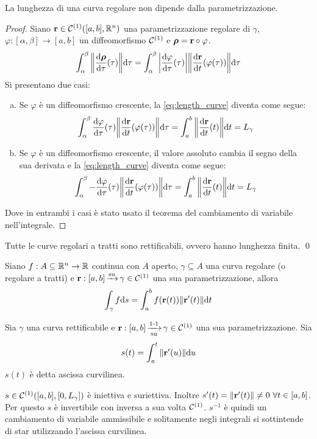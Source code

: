 \begin{prop}\label{prop:length_invariance}
	La lunghezza di una curva regolare non dipende dalla parametrizzazione.
\end{prop}

\begin{proof}
	Siano $\vb{r}\in\mathcal{C}^{(1)}([a,b],\mathbb{R}^n)$ una parametrizzazione regolare di $\gamma$, $\varphi:[\alpha,\beta]\to[a,b]$ un diffeomorfismo $\mathcal{C}^{(1)}$ e $\bm{\rho}=\vb{r}\circ\varphi$.
	\begin{equation}\label{eq:length_curve}
		\int_{\alpha}^{\beta}\norm{\frac{\dd \bm\rho}{\dd \tau}(\tau)}\dd \tau
		=\int_{\alpha}^{\beta}\abs{\frac{\dd \varphi}{\dd \tau}(\tau)}\norm{\frac{\dd \vb{r}}{\dd t}(\varphi(\tau))}\dd \tau
	\end{equation}
	Si presentano due casi:
	\begin{enumerate}[a.]
		\item Se $\varphi$ è un diffeomorfismo crescente, la \eqref{eq:length_curve} diventa come segue:
		$$
			\int_{\alpha}^{\beta}\frac{\dd \varphi}{\dd \tau}(\tau)\norm{\frac{\dd \vb{r}}{\dd t}(\varphi(\tau))}\dd \tau=\int_{a}^{b}\norm{\frac{\dd \vb{r}}{\dd t}(t)}\dd t=L_\gamma
		$$
		\item Se $\varphi$ è un diffeomorfismo crescente, il valore assoluto cambia il segno della sua derivata e la \eqref{eq:length_curve} diventa come segue:
		$$
		\int_{\alpha}^{\beta}-\frac{\dd \varphi}{\dd \tau}(\tau)\norm{\frac{\dd \vb{r}}{\dd t}(\varphi(\tau))}\dd \tau=\int_{a}^{b}\norm{\frac{\dd \vb{r}}{\dd t}(t)}\dd t=L_\gamma
		$$
	\end{enumerate}
	Dove in entrambi i casi è stato usato il teorema del cambiamento di variabile nell'integrale.
\end{proof}

\begin{prop}
	Tutte le curve regolari a tratti sono rettificabili, ovvero hanno lunghezza finita.
	\qed
\end{prop}

\begin{definition}
	Siano $f: A\subseteq\mathbb{R}^n \to \mathbb{R}$ continua con $A$ aperto, $\gamma \subseteq A$ una curva regolare (o regolare a tratti) e $\vb{r}:[a,b]\operatorname{\xrightarrow{\operatorname{su}}} \gamma \in \mathcal{C}^{(1)}$ una sua parametrizzazione, allora
	$$
		\int_\gamma f \dd s = \int_a^b f(\vb{r}(t))\norm{\vb{r}'(t)}\dd t
	$$
\end{definition}

\begin{definition}
	Sia $\gamma$ una curva rettificabile e $\vb{r}:[a,b]\operatorname{\xrightarrow[\operatorname{su}]{\operatorname{1-1}}}\gamma \in \mathcal{C}^{(1)}$ una sua parametrizzazione. Sia
	$$
		s(t)=\int_a^t\norm{\vb{r}'(u)}\dd u
	$$
	$s(t)$ è detta ascissa curvilinea.
\end{definition}
$s\in\mathcal{C}^{(1)}([a,b],[0,L_\gamma])$ è iniettiva e suriettiva. Inoltre $s'(t)=\norm{\vb{r}'(t)}\neq0 \ \forall t \in [a,b]$. Per questo $s$ è invertibile con inversa a sua volta $\mathcal{C}^{(1)}$. $s^{-1}$ è quindi un cambiamento di variabile ammissibile e solitamente negli integrali si sottintende di star utilizzando l'ascissa curvilinea.

